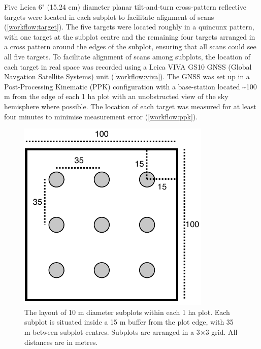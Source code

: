 \begin{refsection}
Five Leica 6" (15.24 cm) diameter planar tilt-and-turn cross-pattern reflective targets were located in each subplot to facilitate alignment of scans (\autoref{workflow:target}). The five targets were located roughly in a quincunx pattern, with one target at the subplot centre and the remaining four targets arranged in a cross pattern around the edges of the subplot, ensuring that all scans could see all five targets. To facilitate alignment of scans among subplots, the location of each target in real space was recorded using a Leica VIVA GS10 GNSS (Global Navgation Satellite Systems) unit (\autoref{workflow:viva}). The GNSS was set up in a Post-Processing Kinematic (PPK) configuration with a base-station located \textasciitilde{}100 m from the edge of each 1 ha plot with an unobstructed view of the sky hemisphere where possible. The location of each target was measured for at least four minutes to minimise measurement error (\autoref{workflow:ppk}). 

\begin{figure}
	\includegraphics[width=0.5\linewidth]{img/plot}
	\caption[Subplot layout]{The layout of 10 m diameter subplots within each 1 ha plot. Each subplot is situated inside a 15 m buffer from the plot edge, with 35 m between subplot centres. Subplots are arranged in a 3$\times$3 grid. All distances are in metres.}
	\label{workflow:subplot_plot}
\end{figure}


\end{refsection}
